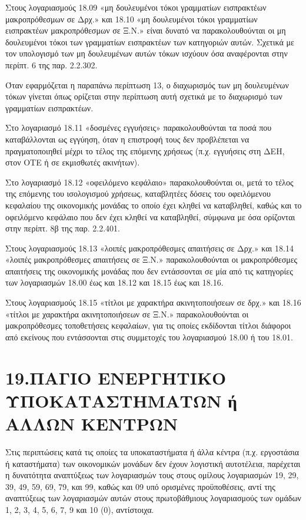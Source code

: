\documentclass[A4,10pt,greek]{book}
\begin{document}
Στους λογαριασμούς 18.09 «μη δουλευμένοι τόκοι γραμματίων εισπρακτέων μακροπρόθεσμων σε Δρχ.» και 18.10 «μη δουλευμένοι τόκοι γραμματίων εισπρακτέων μακροπρόθεσμων σε Ξ.Ν.» είναι δυνατό να παρακολουθούνται οι μη δουλευμένοι τόκοι των γραμματίων εισπρακτέων των κατηγοριών αυτών. Σχετικά με τον υπολογισμό των μη δουλευμένων αυτών τόκων ισχύουν όσα αναφέρονται στην περίπτ.  6 της παρ. 2.2.302.

Όταν εφαρμόζεται η παραπάνω περίπτωση 13, ο διαχωρισμός των μη δουλευμένων τόκων γίνεται όπως ορίζεται στην περίπτωση αυτή σχετικά με το διαχωρισμό των γραμματίων εισπρακτέων.

Στο λογαριασμό 18.11 «δοσμένες εγγυήσεις» παρακολουθούνται τα ποσά που καταβάλλονται ως εγγύηση, όταν η επιστροφή τους δεν προβλέπεται να πραγματοποιηθεί μέχρι το τέλος της επόμενης χρήσεως (π.χ. εγγυήσεις στη ΔΕΗ, στον ΟΤΕ ή σε εκμισθωτές ακινήτων).

Στο λογαριασμό 18.12 «οφειλόμενο κεφάλαιο» παρακολουθούνται οι, μετά το τέλος της επόμενης του ισολογισμού χρήσεως, καταβλητέες δόσεις του οφειλόμενου κεφαλαίου της οικονομικής μονάδας το οποίο έχει κληθεί να καταβληθεί, καθώς και το οφειλόμενο κεφάλαιο που δεν έχει κληθεί να καταβληθεί, σύμφωνα με όσα ορίζονται στην περίπτ. 8β της παρ. 2.2.401.

Στους λογαριασμούς 18.13 «λοιπές μακροπρόθεσμες απαιτήσεις σε Δρχ.» και 18.14 «λοιπές μακροπρόθεσμες απαιτήσεις σε Ξ.Ν.» παρακολουθούνται οι μακροπρόθεσμες απαιτήσεις της οικονομικής μονάδας που δεν εντάσσονται σε μία από τις κατηγορίες των λογαριασμών 18.00 έως και 18.12 και 18.15 έως και 18.16.

Στους λογαριασμούς 18.15 «τίτλοι με χαρακτήρα ακινητοποιήσεων σε δρχ.» και 18.16 «τίτλοι με χαρακτήρα ακινητοποιήσεων σε Ξ.Ν.» παρακολουθούνται οι μακροπρόθεσμες τοποθετήσεις κεφαλαίων, για τις οποίες εκδίδονται τίτλοι διάφοροι από εκείνους που εντάσσονται στις συμμετοχές του λογαριασμού 18.00 ή του 18.01.

\section{19.ΠΑΓΙΟ ΕΝΕΡΓΗΤΙΚΟ ΥΠΟΚΑΤΑΣΤΗΜΑΤΩΝ ή ΑΛΛΩΝ ΚΕΝΤΡΩΝ}

Στις περιπτώσεις κατά τις οποίες τα υποκαταστήματα ή άλλα κέντρα (π.χ.  εργοστάσια ή καταστήματα) των οικονομικών μονάδων δεν έχουν λογιστική αυτοτέλεια, παρέχεται η δυνατότητα αναπτύξεως των λογαριασμών τους στους ομίλους λογαριασμών 19, 29, 39, 49, 59, 69, 79, και 99, καθώς και 09 υπό ορισμένες προϋποθέσεις, αντί της αναπτύξεως των λογαριασμών αυτών στους πρωτοβάθμιους λογαριασμούς των ομάδων 1, 2, 3, 4, 5, 6, 7, 9 και 10 (0), αντίστοιχα.
\end{document}
